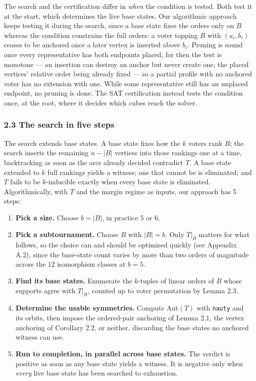 \documentclass[
]{article}
\providecommand{\tightlist}{%
  \setlength{\itemsep}{0pt}\setlength{\parskip}{0pt}}
\begin{document}
The search and the certification differ in \emph{when} the condition is
tested. Both test it at the start, which determines the live base
states. Our algorithmic approach keeps testing it during the search,
since a base state fixes the orders only on \(B\) whereas the condition
constrains the full orders: a voter topping \(B\) with \((a_i, b_i)\)
ceases to be anchored once a later vertex is inserted above \(b_i\).
Pruning is sound once every representative has both endpoints placed,
for then the test is monotone --- an insertion can destroy an anchor but
never create one, the placed vertices' relative order being already
fixed --- so a partial profile with no anchored voter has no extension
with one. While some representative still has an unplaced endpoint, no
pruning is done. The SAT certification instead tests the condition once,
at the root, where it decides which cubes reach the solver.

\subsubsection{2.3 The search in five
steps}\label{the-search-in-five-steps}

The search extends base states. A base state fixes how the \(k\) voters
rank \(B\); the search inserts the remaining \(n - |B|\) vertices into
those rankings one at a time, backtracking as soon as the arcs already
decided contradict \(T\). A base state extended to \(k\) full rankings
yields a witness; one that cannot be is eliminated; and \(T\) fails to
be \(k\)-inducible exactly when every base state is eliminated.
Algorithmically, with \(T\) and the margin regime as inputs, our
approach has 5 steps:

\begin{enumerate}
\def\labelenumi{\arabic{enumi}.}
\tightlist
\item
  \textbf{Pick a size.} Choose \(b = |B|\), in practice \(5\) or \(6\).
\item
  \textbf{Pick a subtournament.} Choose \(B\) with \(|B| = b\). Only
  \(T|_B\) matters for what follows, so the choice can and should be
  optimised quickly (see Appendix A.2), since the base-state count
  varies by more than two orders of magnitude across the \(12\)
  isomorphism classes at \(b = 5\).
\item
  \textbf{Find its base states.} Enumerate the \(k\)-tuples of linear
  orders of \(B\) whose supports agree with \(T|_B\), counted up to
  voter permutation by Lemma 2.3.
\item
  \textbf{Determine the usable symmetries.} Compute \(\mathrm{Aut}(T)\)
  with \texttt{nauty} and its orbits, then impose the ordered-pair
  anchoring of Lemma 2.1, the vertex anchoring of Corollary 2.2, or
  neither, discarding the base states no anchored witness can use.
\item
  \textbf{Run to completion, in parallel across base states.} The
  verdict is positive as soon as any base state yields a witness. It is
  negative only when \emph{every} live base state has been searched to
  exhaustion.
\end{enumerate}
\end{document}
